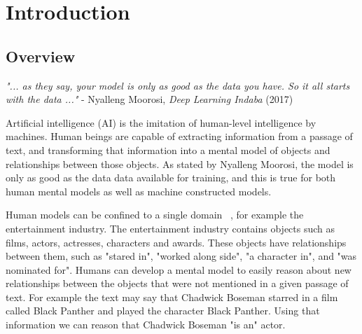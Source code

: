 
\chapter{Introduction}  %

\ifpdf
     \graphicspath{{Figs/Chapter1/}}
\else
    \graphicspath{{Chapter1/Figs/Vector/}{Chapter1/Figs/}}
\fi



\section{Overview} %

\emph{"... as they say, your model is only as good as the data you have. \newline So it all starts with the data ..."} \newline
\indent \indent - Nyalleng Moorosi, \emph{Deep Learning Indaba} (2017) \par

\smallskip

\noindent Artificial intelligence (AI) is the imitation of human-level intelligence by machines. Human beings are capable of extracting information from a passage of text, and transforming that information into a mental model of objects and relationships between those objects. As stated by Nyalleng Moorosi, the model is only as good as the data data available for training, and this is true for both human mental models as well as machine constructed models. \par

\noindent Human models can be confined to a single domain \unskip~\citep{staab2010handbook}, for example the entertainment industry. The entertainment industry contains objects such as films, actors, actresses, characters and awards. These objects have relationships between them, such as "stared in", "worked along side", "a character in", and "was nominated for". Humans can develop a mental model to easily reason about new relationships between the objects that were not mentioned in a given passage of text. For example the text may say that Chadwick Boseman starred in a film called Black Panther and played the character Black Panther. Using that information we can reason that Chadwick Boseman "is an" actor. \par

